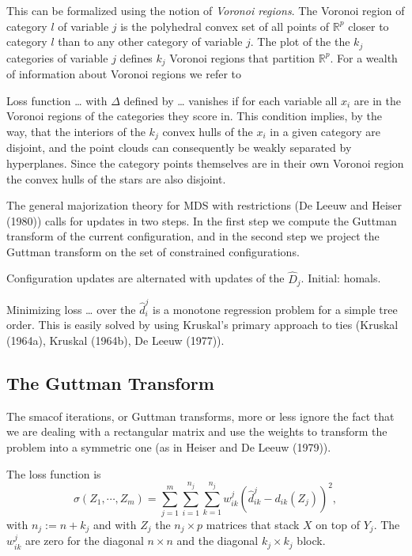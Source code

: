 \documentclass[
  12pt,
]{article}
\begin{document}
This can be formalized using the notion of \emph{Voronoi regions}. The Voronoi region of
category \(l\) of variable \(j\) is the polyhedral convex set of all points of \(\mathbb{R}^p\) closer to category \(l\) than to any other category of variable \(j\). The plot of the the \(k_j\) categories of variable \(j\) defines \(k_j\) Voronoi regions that
partition \(\mathbb{R}^p\). For a wealth of information about Voronoi regions we refer to

Loss function \ldots{} with \(\Delta\) defined by \ldots{} vanishes if for each variable all \(x_i\) are in the Voronoi regions of the categories they score in. This condition implies, by the way, that the interiors of the \(k_j\) convex hulls of the \(x_i\) in a given category are disjoint, and the point clouds can consequently be weakly separated by hyperplanes. Since the category points themselves are in their own Voronoi region the convex hulls of the stars are also disjoint.

The general majorization theory for MDS with restrictions (De Leeuw and Heiser (1980))
calls for updates
in two steps. In the first step we compute the Guttman transform of the current configuration, and in the second step we project the Guttman transform on the
set of constrained configurations.

Configuration updates are alternated with updates of the \(\hat D_j\). Initial: homals.

Minimizing loss \ldots{} over the \(\hat d_i^j\) is a monotone regression problem for a simple tree
order. This is easily solved by using Kruskal's primary approach to ties
(Kruskal (1964a), Kruskal (1964b), De Leeuw (1977)).

\subsection{The Guttman Transform}\label{the-guttman-transform}

The smacof iterations, or Guttman transforms, more or less ignore the fact that we are dealing with a rectangular matrix and use the weights to transform the problem into a symmetric one (as in Heiser and De Leeuw (1979)).

The loss function is
\[
\sigma(Z_1,\cdots,Z_m)=\sum_{j=1}^m\sum_{i=1}^{n_j}\sum_{k=1}^{n_j}w_{ik}^j(\hat d_{ik}^j-d_{ik}(Z_j))^2,
\]
with \(n_j:=n+k_j\) and with \(Z_j\) the \(n_j\times p\) matrices that stack \(X\) on top of
\(Y_j\). The \(w_{ik}^j\) are zero for the diagonal \(n\times n\) and the diagonal
\(k_j\times k_j\) block.
\end{document}
